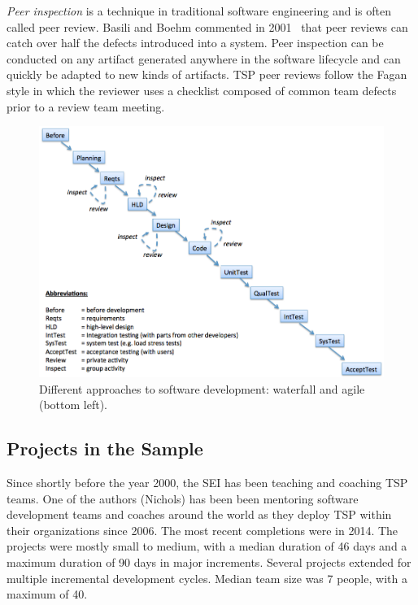   
 
{\em Peer inspection} is a  technique in
traditional software engineering and is often called peer review.
 Basili and Boehm   commented in 2001~\cite{boehm01} 
that peer reviews can catch over half the defects introduced into a system.
Peer inspection can be conducted on any artifact generated anywhere in the software
lifecycle and can quickly be adapted to new kinds of artifacts. TSP peer reviews follow the Fagan style in which the reviewer uses a checklist composed of common team defects prior to a review team meeting. 


\begin{figure}[!t]
\begin{center}
\includegraphics[width=6in]{waterfall-v2.png}
\end{center}
\caption{Different approaches to software development:  waterfall and agile (bottom left).}
\label{fig:waterfall}
\end{figure}


\subsection{Projects in the Sample}
Since shortly before the year 2000, the SEI has been teaching and coaching TSP teams. One of the authors (Nichols) has been been mentoring software development teams and coaches around the world as they deploy TSP within their organizations since 2006.  The  most recent completions were in 2014.
The projects were mostly small to medium, with a median duration of 46 days and a maximum duration of 90 days in major increments. 
Several projects extended for multiple incremental development cycles. 
Median team size was 7 people, with a maximum of 40. 

